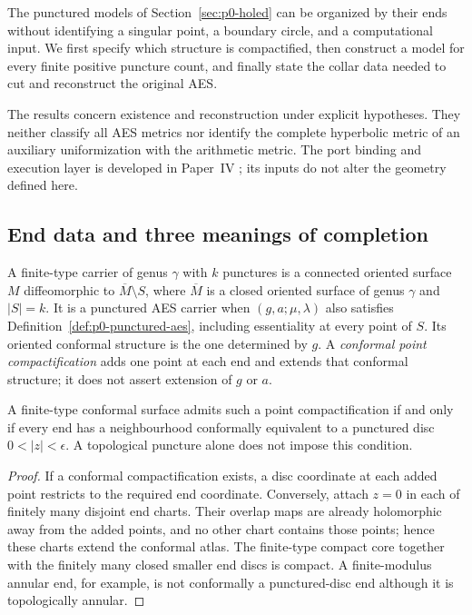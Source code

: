 The punctured models of Section~\ref{sec:p0-holed} can be organized by their
ends without identifying a singular point, a boundary circle, and a computational
input.  We first specify which structure is compactified, then construct a
model for every finite positive puncture count, and finally state the collar
data needed to cut and reconstruct the original AES.

The results concern existence and reconstruction under explicit hypotheses.
They neither classify all AES metrics nor identify the complete hyperbolic
metric of an auxiliary uniformization with the arithmetic metric.  The port
binding and execution layer is developed in Paper~IV
\cite{Yuan2026AEGCondensation}; its inputs do not alter the geometry defined here.

\subsection{End data and three meanings of completion}
\label{subsec:p0-end-data}

\begin{definition}
\label{def:p0-finite-type-carrier}
A finite-type carrier of genus $\gamma$ with $k$ punctures is a connected
oriented surface $M$ diffeomorphic to $\overline M\setminus S$, where
$\overline M$ is a closed oriented surface of genus $\gamma$ and $|S|=k$.
It is a punctured AES carrier when $(g,a;\mu,\lambda)$ also satisfies
Definition~\ref{def:p0-punctured-aes}, including essentiality at every point of
$S$.  Its oriented conformal structure is the one determined by $g$.
A \emph{conformal point compactification} adds one point at each end and
extends that conformal structure; it does not assert extension of $g$ or $a$.
\end{definition}

\begin{proposition}
\label{prop:p0-conformal-end-filling}
A finite-type conformal surface admits such a point compactification if and
only if every end has a neighbourhood conformally equivalent to a punctured
disc $0<|z|<\epsilon$.  A topological puncture alone does not impose this
condition.
\end{proposition}

\begin{proof}
If a conformal compactification exists, a disc coordinate at each added point
restricts to the required end coordinate.  Conversely, attach $z=0$ in each
of finitely many disjoint end charts.  Their overlap maps are already
holomorphic away from the added points, and no other chart contains those
points; hence these charts extend the conformal atlas.  The finite-type
compact core together with the finitely many closed smaller end discs is
compact.  A finite-modulus annular end, for example, is not conformally a
punctured-disc end although it is topologically annular.
\end{proof}

